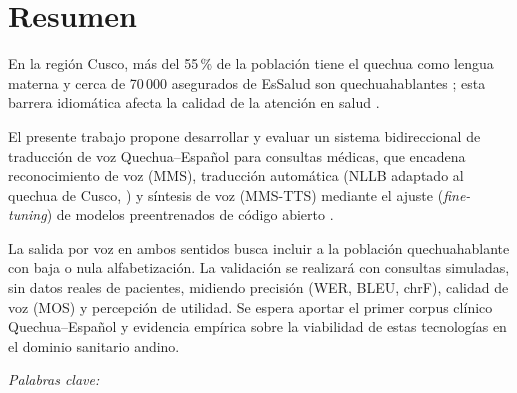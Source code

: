 
\hypersetup{pageanchor=true}

\section*{Resumen}
\singlespacing\noindent
En la regi{\'o}n Cusco, m{\'a}s del 55\,\% de la poblaci{\'o}n tiene el quechua como lengua
materna y cerca de 70\,000 asegurados de EsSalud son quechuahablantes \parencite{essalud2023};
esta barrera idiom{\'a}tica afecta la calidad de la atenci{\'o}n en salud \parencite{begazo2026}.

El presente trabajo propone desarrollar y evaluar un sistema bidireccional de traducci{\'o}n de
voz Quechua--Espa{\~n}ol para consultas m{\'e}dicas, que encadena reconocimiento de voz (MMS),
traducci{\'o}n autom{\'a}tica (NLLB adaptado al quechua de Cusco, ) y s{\'i}ntesis de
voz (MMS-TTS) mediante el ajuste (\emph{fine-tuning}) de modelos preentrenados de c{\'o}digo
abierto .

La salida por voz en ambos sentidos busca incluir a la poblaci{\'o}n quechuahablante con
baja o nula alfabetizaci{\'o}n. La validaci{\'o}n se realizar{\'a} con consultas simuladas, sin datos
reales de pacientes, midiendo precisi{\'o}n (WER, BLEU, chrF), calidad de voz (MOS) y percepci{\'o}n
de utilidad. Se espera aportar el primer corpus cl{\'i}nico Quechua--Espa{\~n}ol y evidencia
emp{\'i}rica sobre la viabilidad de estas tecnolog{\'i}as en el dominio sanitario andino.

\vspace{0.3cm}
\textit{Palabras clave:} 
\onehalfspacing

\ifdocente
\vspace{0.4cm}
\noindent{}
\fi

